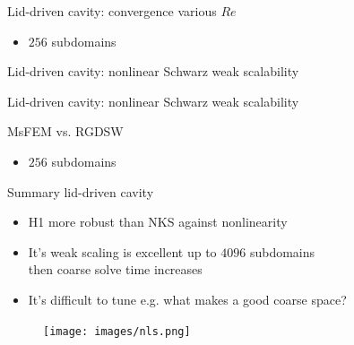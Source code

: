 \begin{frame}{Lid-driven cavity: convergence various $Re$}
	\begin{itemize}
		\item $256$ subdomains
	\end{itemize}
	\begin{figure}
		\centering
		
		\label{fig:residual-ldc}
	\end{figure}
\end{frame}

\begin{frame}{Lid-driven cavity: nonlinear Schwarz weak scalability}
	\begin{figure}
		\centering
		
		\label{fig:weak-scalability-nls}
	\end{figure}
\end{frame}

\begin{frame}{Lid-driven cavity: nonlinear Schwarz weak scalability}
	\begin{figure}
		\centering
		
		\label{fig:weak-scalability-per-iter-nls}
	\end{figure}
\end{frame}
\begin{frame}{MsFEM vs. RGDSW}
	\begin{itemize}
		\item $256$ subdomains
	\end{itemize}
	\begin{figure}
		\centering
		
		\label{fig:msfem-vs-rgdsw}
	\end{figure}
\end{frame}

\begin{frame}{Summary lid-driven cavity}
	\begin{itemize}
    \item H1 more robust than NKS against nonlinearity
    \item It's weak scaling is excellent up to $4096$ subdomains\\then coarse solve time increases %
		\item It's difficult to tune e.g. what makes a good coarse space?%
	\end{itemize}

	\begin{figure}
		\texttt{[image: images/nls.png]}
	\end{figure}
\end{frame}


